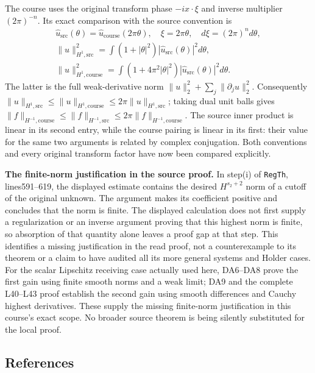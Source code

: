 \documentclass[
  11pt,
]{article}
\begin{document}
The course uses the original transform phase \(-ix\cdot\xi\) and inverse
multiplier \((2\pi)^{-n}\). Its exact comparison with the source
convention is \[
 \begin{gathered}
 \widehat u_{\mathrm{src}}(\theta)=\widehat u_{\mathrm{course}}(2\pi\theta),
 \quad \xi=2\pi\theta,\quad d\xi=(2\pi)^n d\theta,\\
  \|u\|_{H^1,\mathrm{src}}^2=\int(1+|\theta|^2)|\widehat u_{\mathrm{src}}(\theta)|^2d\theta,\\
  \|u\|_{H^1,\mathrm{course}}^2=\int(1+4\pi^2|\theta|^2)|\widehat u_{\mathrm{src}}(\theta)|^2d\theta.
 \end{gathered}\tag{DA21}
\] The latter is the full weak-derivative norm
\(\|u\|_2^2+\sum_j\|\partial_ju\|_2^2\). Consequently
\(\|u\|_{H^1,\mathrm{src}}\leq\|u\|_{H^1,\mathrm{course}}\leq2\pi\|u\|_{H^1,\mathrm{src}}\);
taking dual unit balls gives
\(\|f\|_{H^{-1},\mathrm{course}}\leq\|f\|_{H^{-1},\mathrm{src}}\leq2\pi\|f\|_{H^{-1},\mathrm{course}}\).
The source inner product is linear in its second entry, while the course
pairing is linear in its first: their value for the same two arguments
is related by complex conjugation. Both conventions and every original
transform factor have now been compared explicitly.

\textbf{The finite-norm justification in the source proof.} In step(i)
of \texttt{RegTh}, lines591--619, the displayed estimate contains the
desired \(H^{s_2+2}\) norm of a cutoff of the original unknown. The
argument makes its coefficient positive and concludes that the norm is
finite. The displayed calculation does not first supply a regularization
or an inverse argument proving that this highest norm is finite, so
absorption of that quantity alone leaves a proof gap at that step. This
identifies a missing justification in the read proof, not a
counterexample to its theorem or a claim to have audited all its more
general systems and Holder cases. For the scalar Lipschitz receiving
case actually used here, DA6--DA8 prove the first gain using finite
smooth norms and a weak limit; DA9 and the complete L40--L43 proof
establish the second gain using smooth differences and Cauchy highest
derivatives. These supply the missing finite-norm justification in this
course's exact scope. No broader source theorem is being silently
substituted for the local proof.

\subsection{References}\label{references}
\end{document}
